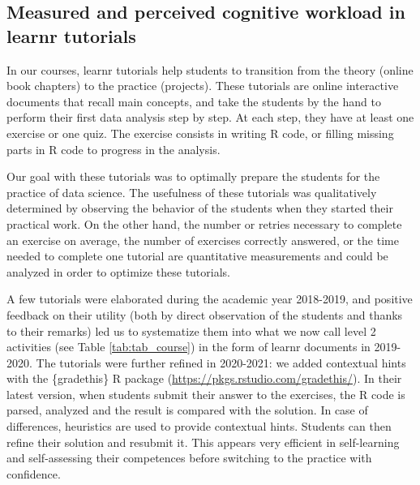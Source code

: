 \documentclass{aims}
\theoremstyle{definition}
\begin{document}
\hypertarget{measured-and-perceived-cognitive-workload-in-learnr-tutorials-1}{%
\subsection{Measured and perceived cognitive workload in learnr
tutorials}\label{measured-and-perceived-cognitive-workload-in-learnr-tutorials-1}}

In our courses, learnr tutorials help students to transition from the
theory (online book chapters) to the practice (projects). These
tutorials are online interactive documents that recall main concepts,
and take the students by the hand to perform their first data analysis
step by step. At each step, they have at least one exercise or one quiz.
The exercise consists in writing R code, or filling missing parts in R
code to progress in the analysis.

Our goal with these tutorials was to optimally prepare the students for
the practice of data science. The usefulness of these tutorials was
qualitatively determined by observing the behavior of the students when
they started their practical work. On the other hand, the number or
retries necessary to complete an exercise on average, the number of
exercises correctly answered, or the time needed to complete one
tutorial are quantitative measurements and could be analyzed in order to
optimize these tutorials.

A few tutorials were elaborated during the academic year 2018-2019, and
positive feedback on their utility (both by direct observation of the
students and thanks to their remarks) led us to systematize them into
what we now call level 2 activities (see Table \ref {tab:tab_course}) in
the form of learnr documents in 2019-2020. The tutorials were further
refined in 2020-2021: we added contextual hints with the \{gradethis\} R
package (\url{https://pkgs.rstudio.com/gradethis/}). In their latest
version, when students submit their answer to the exercises, the R code
is parsed, analyzed and the result is compared with the solution. In
case of differences, heuristics are used to provide contextual hints.
Students can then refine their solution and resubmit it. This appears
very efficient in self-learning and self-assessing their competences
before switching to the practice with confidence.
\end{document}
